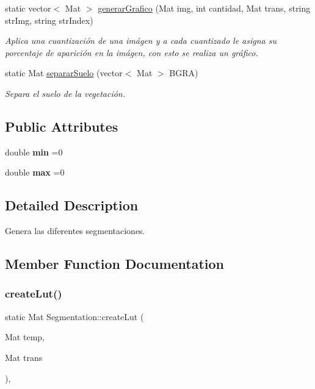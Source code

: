\begin{DoxyCompactItemize}
static vector$<$ Mat $>$ \mbox{\hyperlink{classSegmentation_aa8c04dc48fccc7fdaee6c377ac2ee02e}{generar\+Grafico}} (Mat img, int cantidad, Mat trans, string str\+Img, string str\+Index)
\begin{DoxyCompactList}\small\item\em Aplica una cuantización de una imágen y a cada cuantizado le asigna su porcentaje de aparición en la imágen, con esto se realiza un gráfico. \end{DoxyCompactList}\item 
static Mat \mbox{\hyperlink{classSegmentation_abe304fc9d6a13f16927ae7682f90b540}{separar\+Suelo}} (vector$<$ Mat $>$ B\+G\+RA)
\begin{DoxyCompactList}\small\item\em Separa el suelo de la vegetación. \end{DoxyCompactList}\end{DoxyCompactItemize}
\subsection*{Public Attributes}
\begin{DoxyCompactItemize}
\item 
\mbox{\label{classSegmentation_a9eb5fd1fcc0bbac6ed405b5907461918}} 
double {\bfseries min} =0
\item 
\mbox{\label{classSegmentation_ad885b287f4bedc6a72725c9ea3318bcf}} 
double {\bfseries max} =0
\end{DoxyCompactItemize}


\subsection{Detailed Description}
Genera las diferentes segmentaciones. 

\subsection{Member Function Documentation}
\mbox{\label{classSegmentation_aa15a21553b49e70fc2ee5a3be3ff9695}} 
\subsubsection{\texorpdfstring{create\+Lut()}{createLut()}}
{\footnotesize\ttfamily static Mat Segmentation\+::create\+Lut (\begin{DoxyParamCaption}\item[{Mat}]{temp,  }\item[{Mat}]{trans }\end{DoxyParamCaption})\hspace{0.3cm}{\ttfamily [inline]}, {\ttfamily [static]}}



